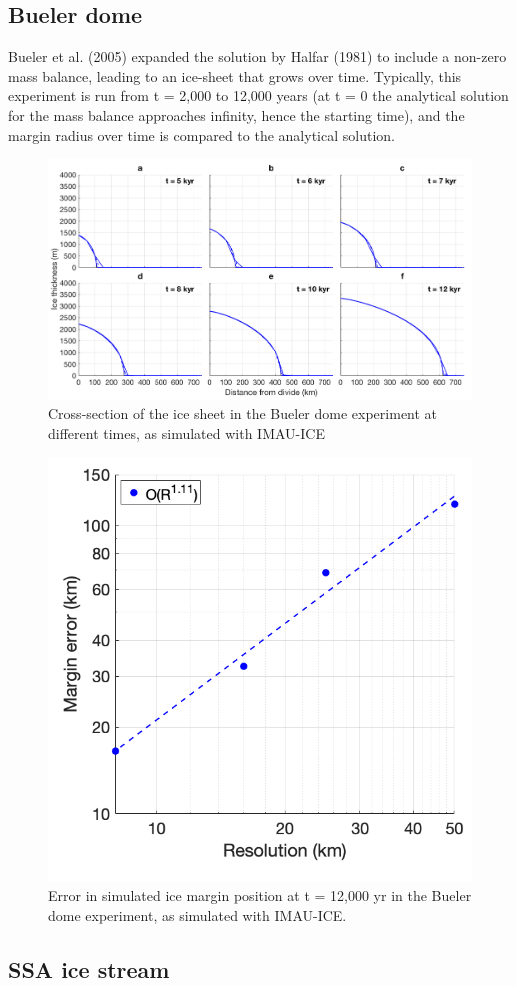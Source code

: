 \documentclass{article}
\begin{document}
\subsection{Bueler dome}

Bueler et al. (2005) expanded the solution by Halfar (1981) to include a non-zero mass balance, leading to an ice-sheet that grows over time. Typically, this experiment is run from t = 2,000 to 12,000 years (at t = 0 the analytical solution for the mass balance approaches infinity, hence the starting time), and the margin radius over time is compared to the analytical solution.

\begin{figure}[H]
  \includegraphics[width=0.95\linewidth]{Fig_benchmark_Bueler1.png}
  \caption{Cross-section of the ice sheet in the Bueler dome experiment at different times, as simulated with IMAU-ICE}
\end{figure}

\begin{figure}[H]
  \includegraphics[width=0.4\linewidth]{Fig_benchmark_Bueler2.png}
  \caption{Error in simulated ice margin position at t = 12,000 yr in the Bueler dome experiment, as simulated with IMAU-ICE.}
\end{figure}

\subsection{SSA ice stream}
\end{document}

